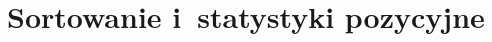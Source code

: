 \documentclass[a4paper,10pt,twoside,openany,titlepage]{book}
\begin{document}
\frontmatter

\allsectionsfont{\sffamily\bfseries}



\ifpdf
	\def\DelBookmark{\def\@writetorep##1##2##3##4{\relax}}
\else
	\def\DelBookmark{\relax}
\fi

\begingroup
	\DelBookmark
	
\endgroup

\ifpdf
\fi

\renewcommand{\cfttoctitlefont}{\Huge\sffamily\bfseries}
\renewcommand{\cftpartfont}{\large\sffamily\bfseries}
\renewcommand{\cftpartpagefont}{\large\sffamily\bfseries}
\renewcommand{\cftchapaftersnum}{.}
\renewcommand{\cftchapfont}{\sffamily\bfseries}
\renewcommand{\cftchappagefont}{\sffamily\bfseries}
\renewcommand{\cftsecfont}{\sffamily}
\renewcommand{\cftsecleader}{\sffamily\cftdotfill{\cftsecdotsep}}
\renewcommand{\cftsecpagefont}{\sffamily}

\tableofcontents

\let\mychapter=\chapter
\renewcommand{\chapter}[1]{%
	\mychapter{#1}
	\setcounter{subsection}{0}
	\def\thesubsection{\thechapter.\arabic{section}-\arabic{subsection}.}
	\lhead[\fancyplain{}{\small\sffamily\bfseries\thepage}]{\fancyplain{}{\small\sffamily\bfseries\rightmark}}
}

\makeatletter
	\@afterindentfalse
	\@afterheading
\makeatother

\mainmatter

% 
% 
% 
% 
% 
% 

\setcounter{part}{1}
\part{Sortowanie i~statystyki pozycyjne}

\setcounter{chapter}{5}


% 
% 

\end{document}
